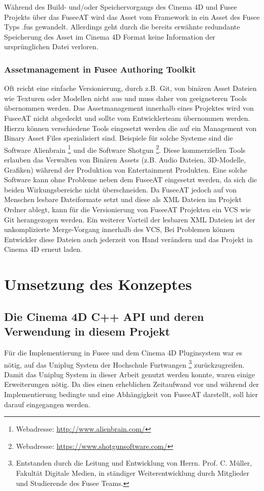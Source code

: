 \documentclass[pagesize, paper=a4, fontsize=12pt, titlepage=true, headings=small, headnosepline, abstractoff, liststotoc, nochapterprefix, plainheadsepline, twoside]{scrreprt}
\begin{document}
Während des Build- und/oder Speichervorgangs des Cinema 4D und Fusee Projekts über das FuseeAT wird das Asset vom Framework in ein Asset des Fusee Typs .fus gewandelt. Allerdings geht durch die bereits erwähnte redundante Speicherung des Asset im Cinema 4D Format keine Information der ursprünglichen Datei verloren.

\subsection{Assetmanagement in Fusee Authoring Toolkit}
Oft reicht eine einfache Versionierung, durch z.B. Git, von binären Asset Dateien wie Texturen oder Modellen nicht aus und muss daher von geeigneteren Tools übernommen werden. Das Assetmanagement innerhalb eines Projektes wird von FuseeAT nicht abgedeckt und sollte vom Entwicklerteam übernommen werden. Hierzu können verschiedene Tools eingesetzt werden die auf ein Management von Binary Asset Files spezialisiert sind. Beispiele für solche Systeme sind die Software Alienbrain \autocite{Alienbrain}\footnote{Webadresse: \url{http://www.alienbrain.com/}} und die Software Shotgun \autocite{Shotgun}\footnote{Webadresse: \url{https://www.shotgunsoftware.com/}}. Diese kommerziellen Tools erlauben das Verwalten von Binären Assets (z.B. Audio Dateien, 3D-Modelle, Grafiken) während der Produktion von Entertainment Produkten. Eine solche Software kann ohne Probleme neben dem FuseeAT eingesetzt werden, da sich die beiden Wirkungsbereiche nicht überschneiden.
Da FuseeAT jedoch auf von Menschen lesbare Dateiformate setzt und diese als XML Dateien im Projekt Ordner ablegt, kann für die Versionierung von FuseeAT Projekten ein VCS wie Git herangezogen werden. Ein weiterer Vorteil der lesbaren XML Dateien ist der unkomplizierte Merge-Vorgang innerhalb des VCS, Bei Problemen können Entwickler diese Dateien auch jederzeit von Hand verändern und das Projekt in Cinema 4D erneut laden.

\chapter{Umsetzung des Konzeptes}
\section{Die Cinema 4D C++ API und deren Verwendung in diesem Projekt}
Für die Implementierung in Fusee und dem Cinema 4D Pluginsystem war es nötig, auf das Uniplug System der Hochschule Furtwangen \footnote{Entstanden durch die Leitung und Entwicklung von Herrn. Prof. C. Müller, Fakultät Digitale Medien, in ständiger Weiterentwicklung durch Mitglieder und Studierende des Fusee Teams.} zurückzugreifen. Damit das Uniplug System in dieser Arbeit genutzt werden konnte, waren einige Erweiterungen nötig. Da dies einen erheblichen Zeitaufwand vor und während der Implementierung bedingte und eine Abhängigkeit von FuseeAT darstellt, soll hier darauf eingegangen werden.
\end{document}
